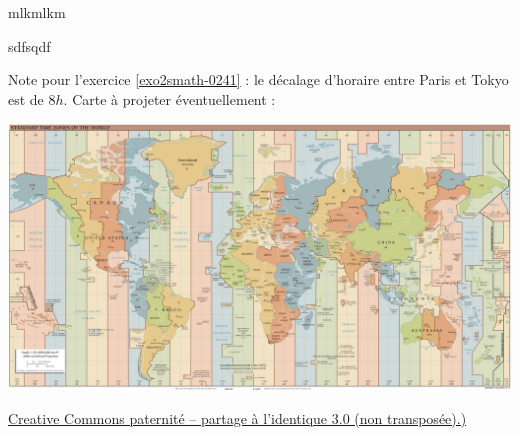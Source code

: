 
mlkmlkm

sdfsqdf


Note pour l'exercice \ref{exo2smath-0241} : le décalage d'horaire entre Paris et Tokyo est de \( 8h\). Carte à projeter éventuellement :

\begin{center}
\includegraphics[width=\linewidth]{TimeZones.pdf}
\end{center}

\href{ http://creativecommons.org/licenses/by-sa/3.0/deed.fr }{Creative Commons paternité – partage à l'identique 3.0 (non transposée).)}

